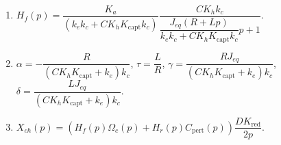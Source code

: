 \ifprof
\else
\ifcolle
\else
\begin{solution}
\begin{enumerate}
\item $ H_f(p)=
\dfrac{K_a }{\left( k_ek_c+CK_hK_{\text{capt}} k_c\right)} \dfrac{CK_h k_c}{\dfrac{J_{eq}\left(R+Lp\right)}{k_ek_c+CK_hK_{\text{capt}} k_c}p+1} $.
\item  $\alpha = - \dfrac{R}{\left( C K_h K_{\text{capt}}+k_e\right) k_c}$,  $\tau = \dfrac{L}{R}$, 
$\gamma = \dfrac{R J_{eq}}{\left( C K_h K_{\text{capt}}+k_e\right) k_c} $, 
$\delta = \dfrac{LJ_{eq}}{\left( C K_h K_{\text{capt}}+k_e\right) k_c}$.
\item $X_{ch}(p)=\left(H_f(p) \Omega_c(p) + H_r(p) C_{\text{pert}}(p)\right) \dfrac{DK_{\text{red}}}{2p}$.
\end{enumerate}
\end{solution}
\fi


\fi